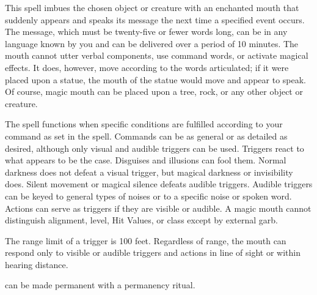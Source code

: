 \spellrng{\rngclose}
\begin{spelleffect}
This spell imbues the chosen object or creature with an enchanted mouth that suddenly appears and speaks its message the next time a specified event occurs. The message, which must be twenty-five or fewer words long, can be in any language known by you and can be delivered over a period of 10 minutes. The mouth cannot utter verbal components, use command words, or activate magical effects. It does, however, move according to the words articulated; if it were placed upon a statue, the mouth of the statue would move and appear to speak. Of course, magic mouth can be placed upon a tree, rock, or any other object or creature.
\par The spell functions when specific conditions are fulfilled according to your command as set in the spell. Commands can be as general or as detailed as desired, although only visual and audible triggers can be used. Triggers react to what appears to be the case. Disguises and illusions can fool them. Normal darkness does not defeat a visual trigger, but magical darkness or invisibility does. Silent movement or magical silence defeats audible triggers. Audible triggers can be keyed to general types of noises or to a specific noise or spoken word. Actions can serve as triggers if they are visible or audible. A magic mouth cannot distinguish alignment, level, Hit Values, or class except by external garb.
\par The range limit of a trigger is 100 feet. Regardless of range, the mouth can respond only to visible or audible triggers and actions in line of sight or within hearing distance.
\end{spelleffect}
\begin{spellnotes}
\par {} can be made permanent with a permanency ritual.
\end{spellnotes}

